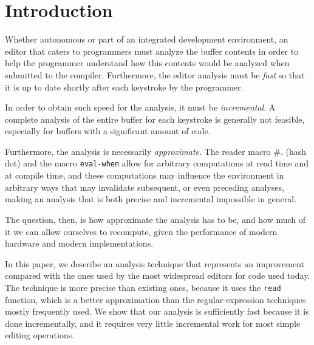 \section{Introduction}

Whether autonomous or part of an integrated development environment,
an editor that caters to \commonlisp{} programmers must analyze the
buffer contents in order to help the programmer understand how this
contents would be analyzed when submitted to the \commonlisp{}
compiler.  Furthermore, the editor analysis must be \emph{fast} so
that it is up to date shortly after each keystroke by the programmer.

In order to obtain such speed for the analysis, it must be
\emph{incremental}.  A complete analysis of the entire buffer for each
keystroke is generally not feasible, especially for buffers with a
significant amount of code.

Furthermore, the analysis is necessarily \emph{approximate}.  The
reader macro \#. (hash dot) and the macro \texttt{eval-when} allow for
arbitrary computations at read time and at compile time, and these
computations may influence the environment in arbitrary ways that may
invalidate subsequent, or even preceding analyses, making an analysis
that is both precise and incremental impossible in general.

The question, then, is how approximate the analysis has to be, and how
much of it we can allow ourselves to recompute, given the performance
of modern hardware and modern \commonlisp{} implementations.

In this paper, we describe an analysis technique that represents an
improvement compared with the ones used by the most widespread editors
for \commonlisp{} code used today.  The technique is more precise than
existing ones, because it uses the \commonlisp{} \texttt{read}
function, which is a better approximation than the regular-expression
techniques mostly frequently used.  We show that our analysis is
sufficiently fast because it is done incrementally, and it requires
very little incremental work for most simple editing operations.

